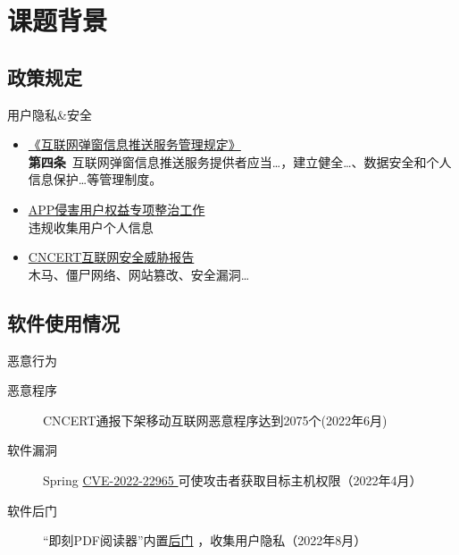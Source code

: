 \section{课题背景}
\subsection{政策规定}
\begin{frame}{用户隐私\&安全}
        \begin{itemize}
        \item \href{http://www.cac.gov.cn/2022-09/08/c_1664260384702890.htm}{《互联网弹窗信息推送服务管理规定》} \\ \textbf{第四条}\ 互联网弹窗信息推送服务提供者应当\ldots，建立健全\ldots 、\alert{数据安全和个人信息保护}\ldots 等管理制度。
        \item \href{https://www.miit.gov.cn/zwgk/zcwj/wjfb/txy/art/2020/art_ef035831a43142259ccab5a758704747.html}{APP侵害用户权益专项整治工作}\\ \alert{违规收集}用户个人信息
        \item \href{https://www.cert.org.cn/publish/main/upload/File/CNCERTreport202207.pdf}{CNCERT互联网安全威胁报告}\\ 木马、僵尸网络、网站篡改、安全漏洞\ldots
    \end{itemize} 
\end{frame}

\subsection{软件使用情况}

\begin{frame}{恶意行为}
        \begin{description}
        \item[恶意程序] CNCERT通报下架移动互联网恶意程序达到2075个(2022年6月)
        \item[软件漏洞] Spring \href{https://spring.io/blog/2022/03/31/spring-framework-rce-early-announcement}{CVE-2022-22965
} 可使攻击者获取目标主机权限（2022年4月）
        \item[软件后门] “即刻PDF阅读器”内置\href{https://www.huorong.cn/info/1660892844878.html}{后门} ，收集用户隐私（2022年8月）
    \end{description}
\end{frame}

